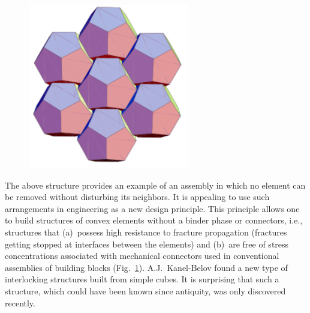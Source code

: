 \begin{figure}[ht]
\begin{center}
  \includegraphics[width=7cm]{Belov/belov-fig6}
\end{center}
\label{fig:belov-fig6}
\end{figure}


The above structure provides an example of an assembly in which no element can
be removed without disturbing its neighbors. It is appealing to use such
arrangements in engineering as a new design principle. This principle allows
one to build structures of convex elements without a binder phase or
connectors, i.e., structures that (a)~possess high resistance to fracture
propagation (fractures getting stopped at interfaces between the elements) and
(b)~are free of stress concentrations associated with mechanical connectors
used in conventional assemblies of building blocks (Fig.~\ref{fig:belov-fig6}).
A.J.~Kanel-Belov found a new type of interlocking structures built
from simple cubes. It is surprising that such a structure, which could
have been known since antiquity, was only discovered recently.




